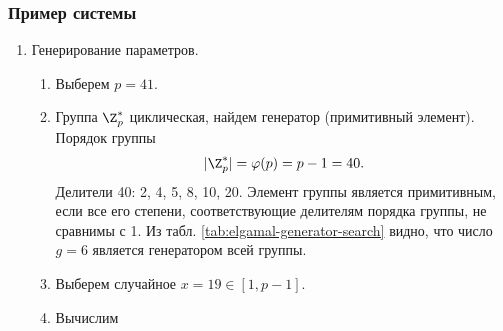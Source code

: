 \subsubsection{Пример системы}

\begin{enumerate}
    \item Генерирование параметров.
        \begin{enumerate}
            \item Выберем $p=41$.
            \item Группа $\Z_p^*$ циклическая, найдем генератор (примитивный элемент). Порядок группы
                \[ |\Z_p^*| = \varphi(p) = p-1 = 40. \]
                Делители 40: 2, 4, 5, 8, 10, 20. Элемент группы является примитивным, если все его степени, соответствующие делителям порядка группы, не сравнимы с 1. Из табл. \ref{tab:elgamal-generator-search} видно, что число $g = 6$ является генератором всей группы.
                \begin{table}[h!]
                    \centering
                    \caption{Поиск генератора в циклической группе $\Z_{41}^*$. Элемент 6 -- генератор\label{tab:elgamal-generator-search}}
                \end{table}
            \item Выберем случайное $x = 19 \in [1, p-1]$.
            \item Вычислим
                \[ \begin{array}{ll}

\end{array}\]
\end{enumerate}
\end{enumerate}
